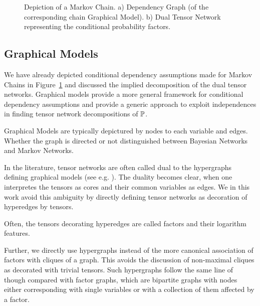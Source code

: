 \begin{figure}[h]
\begin{center}
	
\end{center}
\caption{Depiction of a Markov Chain. 
	a) Dependency Graph (of the corresponding chain Graphical Model).
	b) Dual Tensor Network representing the conditional probability factors.}
\label{fig:MC}
\end{figure}





\subsection{Graphical Models}



We have already depicted conditional dependency assumptions made for Markov Chains in Figure~\ref{fig:MC} and discussed the implied decomposition of the dual tensor networks.
Graphical models provide a more general framework for conditional dependency assumptions and provide a generic approach to exploit independences in finding tensor network decompositions of $\mathbb{P}$.

Graphical Models are typically depictured by nodes to each variable and edges.
Whether the graph is directed or not distinguished between Bayesian Networks and Markov Networks.


\begin{remark}
	In the literature, tensor networks are often called dual to the hypergraphs defining graphical models (see e.g. \cite{robeva_duality_2019}).
	The duality becomes clear, when one interpretes the tensors as cores and their common variables as edges.
	We in this work avoid this ambiguity by directly defining tensor networks as decoration of hyperedges by tensors.
	
	Often, the tensors decorating hyperedges are called factors and their logarithm features.
	
	Further, we directly use hypergraphs instead of the more canonical association of factors with cliques of a graph.
	This avoids the discussion of non-maximal cliques as decorated with trivial tensors.
	Such hypergraphs follow the same line of though compared with factor graphs, which are bipartite graphs with nodes either corresponding with single variables or with a collection of them affected by a factor.
\end{remark}


